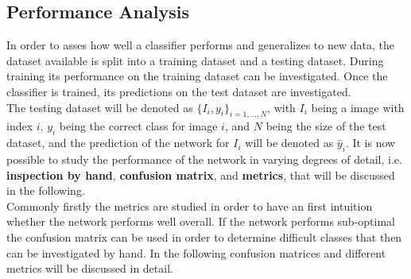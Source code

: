 \subsection{Performance Analysis}
\label{sec:Metrics}

In order to asses how well a classifier performs and generalizes to new data, the dataset available is split into a training dataset and a testing dataset. During training its performance on the training dataset can be investigated. Once the classifier is trained, its predictions on the test dataset are investigated. \\

The testing dataset will be denoted as $\{I_i,y_i\}_{i=1,\dots ,N} $, with $I_i$ being a image with index $i$, $y_i$ being the correct class for image $i$, and $N$ being the size of the test dataset, and the prediction of the network for $I_i$ will be denoted as $\hat{y}_i$. It is now possible to study the performance of the network in varying degrees of detail, i.e. \textbf{inspection by hand}, \textbf{confusion matrix}, and \textbf{metrics}, that will be discussed in the following.\\



Commonly firstly the metrics are studied in order to have an first intuition whether the network performs well overall. If the network performs sub-optimal the confusion matrix can be used in order to determine difficult classes that then can be investigated by hand. In the following confusion matrices and different metrics will be discussed in detail.


